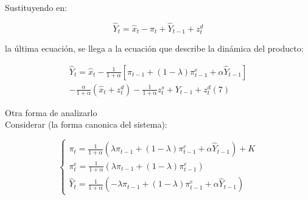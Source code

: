 \documentclass[11pt]{beamer}
\begin{document}
\begin{frame}
		Sustituyendo en:


\begin{equation*}
	\widehat{Y}_{t}=\widehat{x}_{t}-\pi_{t}+\widehat{Y}_{t-1}+z_{t}^{d} \tag{6}
\end{equation*}


la última ecuación, se llega a la ecuación que describe la dinámica del producto:

$$
\begin{gathered}
	\widehat{Y}_{t}=\widehat{x}_{t}-\frac{1}{1+\alpha}\left[\pi_{t-1}+(1-\lambda) \pi_{t-1}^{e}+\alpha \widehat{Y}_{t-1}\right] \\
	-\frac{\alpha}{1+\alpha}\left(\widehat{x}_{t}+z_{t}^{d}\right)-\frac{1}{1+\alpha} z_{t}^{s}+Y_{t-1}+z_{t}^{d}(7)
\end{gathered}
$$
	
\end{frame}	

\begin{frame}
		Otra forma de analizarlo\\
Considerar (la forma canonica del sistema):

\[
\left\{\begin{array}{l}
	\pi_{t}=\frac{1}{1+\alpha}\left(\lambda \pi_{t-1}+(1-\lambda) \pi_{t-1}^{e}+\alpha \widehat{Y}_{t-1}\right)+K  \tag{8}\\
	\pi_{t}^{e}=\frac{1}{1+\alpha}\left(\lambda \pi_{t-1}+(1-\lambda) \pi_{t-1}^{e}\right) \\
	\widehat{Y}_{t}=\frac{1}{1+\alpha}\left(-\lambda \pi_{t-1}+(1-\lambda) \pi_{t-1}^{e}+\alpha \widehat{Y}_{t-1}\right)
\end{array}\right.
\]	
\end{frame}
\end{document}
